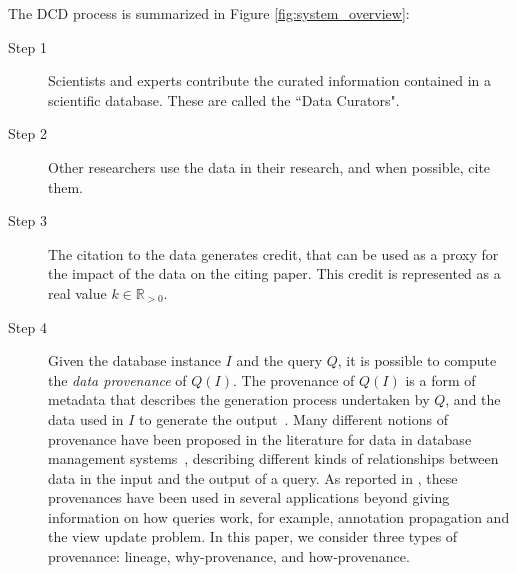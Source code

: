 \vspace{0.15in}
The DCD process is summarized in Figure \ref{fig:system_overview}:
\vspace{0.15in}
\begin{description}
	\item[Step 1] Scientists and experts contribute 
	the curated information contained in a scientific database.  These are called the ``Data Curators".  
	\item[Step 2] Other researchers use the data in their research, and when possible, cite them. 
	\item[Step 3] The citation to the data generates credit, that can be used as a proxy for the impact of the data on the citing paper. This credit is represented as a real value $k \in \mathbb{R}_{>0}$. 
	\item[Step 4] Given the database instance $I$ and the query $Q$, it is possible to compute the \emph{data provenance} of $Q(I)$. The provenance of $Q(I)$ is a form of metadata that describes the generation process undertaken by $Q$, and the data used in $I$ to generate the output~\citep{CheneyProvSurvey}. Many different notions of provenance have been proposed in the literature for data in database management systems~\citep{lineageCui, WhyProvBuneman, howProvenanceGreen}, describing different kinds of relationships between data in the input and the output of a query. As reported in \citep{CheneyProvSurvey}, these provenances have been used in several applications beyond giving information on how queries work, for example, annotation propagation and the view update problem. In this paper, we consider three types of provenance: lineage, why-provenance, and how-provenance. 

\end{description}
